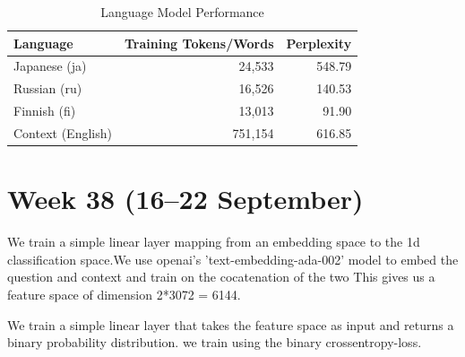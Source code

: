 \documentclass[11pt]{article}
\begin{document}
\begin{table}[ht]
    \centering
    \begin{tabular}{|l|r|r|}
        \hline
        Language & Training Tokens/Words & Perplexity \\
        \hline
        Japanese (ja) & 24,533 & 548.79 \\
        Russian (ru) & 16,526 & 140.53 \\
        Finnish (fi) & 13,013 & 91.90 \\
        Context (English) & 751,154 & 616.85 \\
        \hline
    \end{tabular}
    \caption{Language Model Performance}
    \label{tab:language_model_performance}
\end{table}



\section{Week 38 (16--22 September)}

We train a simple linear layer mapping from an embedding space to the 1d classification space.We use openai's 'text-embedding-ada-002' model to embed the question and context and train on the cocatenation of the two 
This gives us a feature space of dimension 2*3072 = 6144.

We train a simple linear layer that takes the feature space as input and returns a binary probability distribution. we train using the binary crossentropy-loss.
\end{document}
